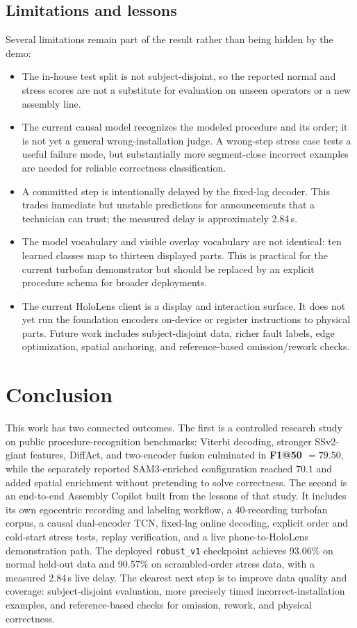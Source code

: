 \documentclass[11pt]{article}
\newcommand{\best}[1]{\textcolor{best}{\textbf{#1}}}
\begin{document}
\subsection{Limitations and lessons}
\label{sec:limitations}

Several limitations remain part of the result rather than being hidden by the demo:

\begin{itemize}
  \item The in-house test split is not subject-disjoint, so the reported normal and stress scores are not a
  substitute for evaluation on unseen operators or a new assembly line.
  \item The current causal model recognizes the modeled procedure and its order; it is not yet a general
  wrong-installation judge. A wrong-step stress case tests a useful failure mode, but substantially more
  segment-close incorrect examples are needed for reliable correctness classification.
  \item A committed step is intentionally delayed by the fixed-lag decoder. This trades immediate but unstable
  predictions for announcements that a technician can trust; the measured delay is approximately 2.84\,s.
  \item The model vocabulary and visible overlay vocabulary are not identical: ten learned classes map to thirteen
  displayed parts. This is practical for the current turbofan demonstrator but should be replaced by an explicit
  procedure schema for broader deployments.
  \item The current HoloLens client is a display and interaction surface. It does not yet run the foundation
  encoders on-device or register instructions to physical parts. Future work includes subject-disjoint data,
  richer fault labels, edge optimization, spatial anchoring, and reference-based omission/rework checks.
\end{itemize}

\section{Conclusion}
This work has two connected outcomes. The first is a controlled research study on public procedure-recognition
benchmarks: Viterbi decoding, stronger SSv2-giant features, DiffAct, and two-encoder fusion culminated in
\best{F1@50 $=79.50$}, while the separately reported SAM3-enriched configuration reached $70.1$ and added spatial
enrichment without pretending to solve correctness. The second is
an end-to-end Assembly Copilot built from the lessons of that study. It includes its own egocentric recording and
labeling workflow, a 40-recording turbofan corpus, a causal dual-encoder TCN, fixed-lag online decoding, explicit
order and cold-start stress tests, replay verification, and a live phone-to-HoloLens demonstration path. The
deployed \texttt{robust\_v1} checkpoint achieves 93.06\% on normal held-out data and 90.57\% on scrambled-order
stress data, with a measured 2.84\,s live delay. The clearest next step is to improve data quality and coverage:
subject-disjoint evaluation, more precisely timed incorrect-installation examples, and reference-based checks for
omission, rework, and physical correctness.
\end{document}
